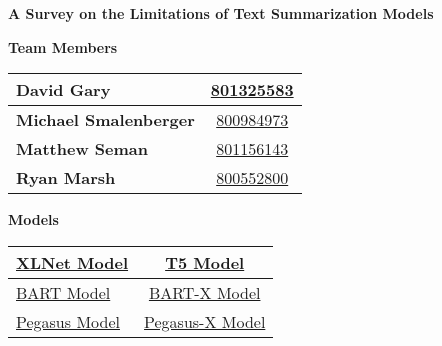 \setlength{\headheight}{15pt}

\vspace{-2pt}

\begin{center}
    \begin{Large}
        \noindent\textbf{A Survey on the Limitations of Text Summarization Models}
    \end{Large}
\end{center}

\vspace{-10pt}

\begin{multicols}{2}

    \begin{center}
        \begin{large}
            \noindent\textbf{Team Members}
        \end{large}
    \end{center}
    \begin{center}
        \begin{tabular}{|lc|}
            \hline
            \textbf{David Gary} & \href{mailto:dgary9@uncc.edu}{801325583} \\ \hline
            \textbf{Michael Smalenberger} & \href{mailto:msmalenb@uncc.edu}{800984973} \\ \hline
            \textbf{Matthew Seman} & \href{mailto:mseman1@uncc.edu}{801156143} \\ \hline
            \textbf{Ryan Marsh} & \href{mailto:rmarsh4@uncc.edu}{800552800} \\ \hline
        \end{tabular}
    \end{center}

    \begin{center}
        \begin{large}
            \noindent\textbf{Models}
        \end{large}
    \end{center}

    \begin{center}
        \begin{tabular}{|lc|}
            \hline
            \href{https://github.com/zihangdai/xlnet}{XLNet Model} & \href{https://huggingface.co/t5-base}{T5 Model} \\ \hline
            \href{https://huggingface.co/facebook/bart-large-cnn}{BART Model} &  \href{https://huggingface.co/facebook/bart-large-xsum}{BART-X Model} \\ \hline
            \href{https://huggingface.co/google/pegasus-large}{Pegasus Model} &  \href{https://huggingface.co/google/pegasus-xsum}{Pegasus-X Model} \\ \hline
        \end{tabular}
    \end{center}



\end{multicols}

